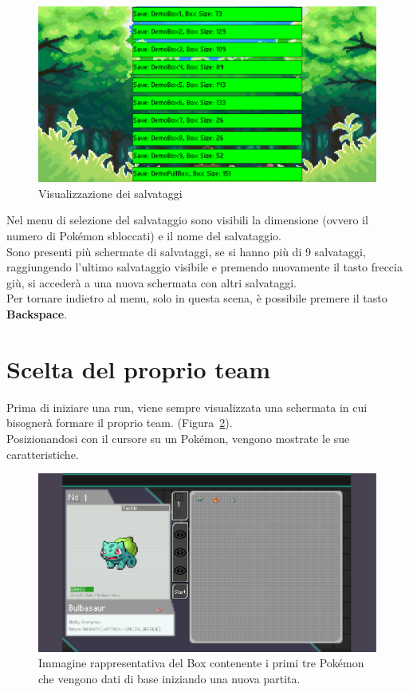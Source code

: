 \documentclass[a4paper,12pt]{report}
\begin{document}
{{\begin{figure}[H]
  \centering
  \includegraphics[width=\textwidth]{immagini/schermataLoad.png}
  \caption{Visualizzazione dei salvataggi}
  \label{fig:load_screen}
\end{figure}

Nel menu di selezione del salvataggio sono visibili la dimensione (ovvero il numero di Pokémon sbloccati) e il nome del salvataggio.\\
Sono presenti più schermate di salvataggi, se si hanno più di 9 salvataggi, raggiungendo l’ultimo salvataggio visibile e premendo nuovamente il tasto freccia giù, si accederà a una nuova schermata con altri salvataggi.\\
Per tornare indietro al menu, solo in questa scena, è possibile premere il tasto \textbf{Backspace}.


\section{Scelta del proprio team}

Prima di iniziare una run, viene sempre visualizzata una schermata in cui bisognerà formare il proprio team. (Figura~\ref{fig:pokemon_panorama}).\\
Posizionandosi con il cursore su un Pokémon, vengono mostrate le sue caratteristiche.


\begin{figure}[H]
  \centering
  \includegraphics[width=\textwidth]{immagini/schermataBox.png}
  \caption{Immagine rappresentativa del Box contenente i primi tre Pokémon che vengono dati di base iniziando una nuova partita.}
  \label{fig:pokemon_panorama}
\end{figure}

}}
\end{document}

